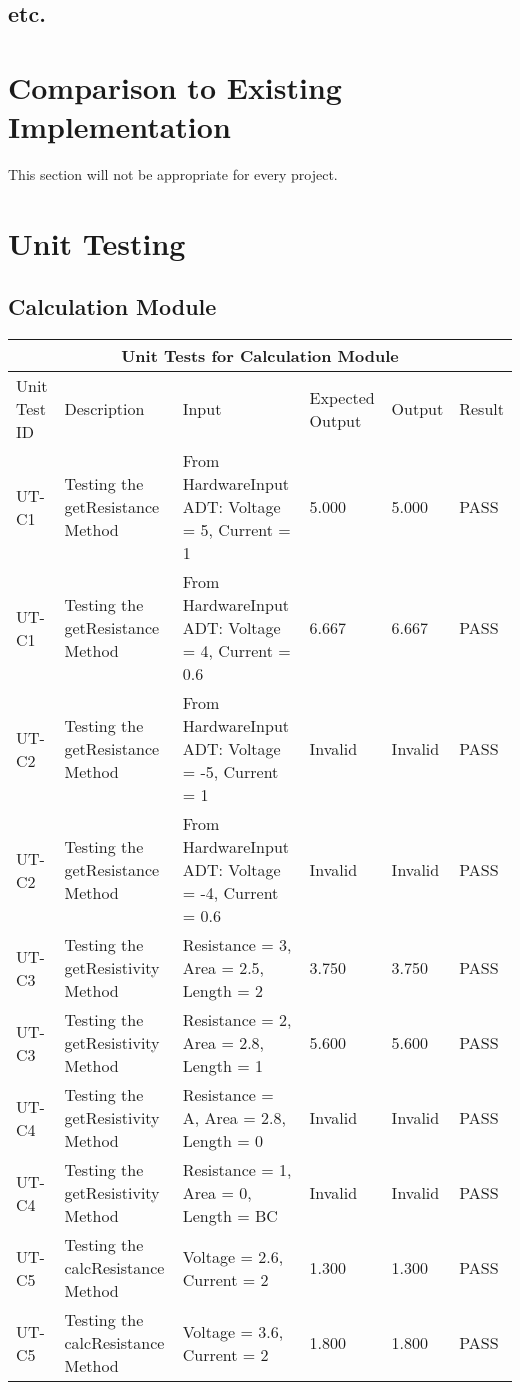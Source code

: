 \documentclass[12pt, titlepage]{article}
\begin{document}
\subsection{etc.}
	
\section{Comparison to Existing Implementation}	

This section will not be appropriate for every project.

\section{Unit Testing}

\subsection{Calculation Module}
\begin{tabular}{ |p{1.5cm}||p{2.5cm}|p{3cm}|p{2cm}|p{2cm}|p{1.5cm}|}
  \hline
  \multicolumn{6}{|c|}{Unit Tests for Calculation Module} \\
  \hline
  Unit Test ID & Description & Input & Expected Output & Output & Result\\
  \hline
  UT-C1   & Testing the getResistance Method  &  From HardwareInput ADT: Voltage = 5, Current = 1 & 5.000 & 5.000 & PASS \\
  \hline
  UT-C1   & Testing the getResistance Method  &  From HardwareInput ADT: Voltage = 4, Current = 0.6 & 6.667 & 6.667 & PASS \\
  \hline
  UT-C2   & Testing the getResistance Method  &  From HardwareInput ADT: Voltage = -5, Current = 1 & Invalid & Invalid & PASS \\
  \hline
  UT-C2   & Testing the getResistance Method  &  From HardwareInput ADT: Voltage = -4, Current = 0.6 & Invalid & Invalid & PASS \\
  \hline
  UT-C3   & Testing the getResistivity Method  &  Resistance = 3, Area = 2.5, Length = 2 & 3.750 & 3.750 & PASS \\
  \hline
  UT-C3   & Testing the getResistivity Method  &  Resistance = 2, Area = 2.8, Length = 1 & 5.600 & 5.600 & PASS \\
  \hline
  UT-C4   & Testing the getResistivity Method  &  Resistance = A, Area = 2.8, Length = 0 & Invalid & Invalid & PASS \\
  \hline
  UT-C4   & Testing the getResistivity Method  &  Resistance = 1, Area = 0, Length = BC & Invalid & Invalid & PASS \\
  \hline
  UT-C5  & Testing the calcResistance Method  &  Voltage = 2.6, Current = 2 & 1.300 & 1.300 & PASS \\
  \hline
  UT-C5  & Testing the calcResistance Method  &  Voltage = 3.6, Current = 2 & 1.800 & 1.800 & PASS \\
  \hline
 \end{tabular}
\end{document}
